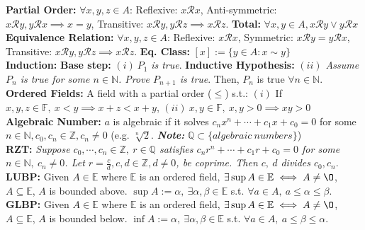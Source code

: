 \documentclass{letter}
\begin{document}
{\small
\textbf{Partial Order:}
$\forall x, y, z \in A$: Reflexive: $x \mathcal{R} x$, Anti-symmetric:
$x \mathcal{R} y, y \mathcal{R} x \implies x = y$, Transitive: $x \mathcal{R} y, y
\mathcal{R} z \implies x \mathcal{R} z$.
\textbf{Total:} $\forall x, y \in A, x \mathcal{R} y \lor y \mathcal{R} x$ \\
\textbf{Equivalence Relation:}
$\forall x, y, z \in A$: Reflexive: $x \mathcal{R} x$, Symmetric:
$x \mathcal{R} y = y \mathcal{R} x$, Transitive: $x \mathcal{R} y, y
\mathcal{R} z \implies x \mathcal{R} z$.
\textbf{Eq. Class:} $[x] := \{y \in A : x \sim y\}$ \\
\textbf{Induction:} \textbf{Base step:} $(i) \ P_1$ \textit{is
true}. \textbf{Inductive Hypothesis:} \textit{$(ii)$ Assume $P_n$ is true
for some $n \in \mathbb{N}$. Prove $P_{n + 1}$ is true}. Then, $P_n$
is true $\forall n \in \mathbb{N}$.
\textbf{Ordered Fields:} A field with a partial order ($\leq$) s.t.:
$(i)$ If $x, y , z \in \mathbb{F}, \ x < y \implies x + z < x + y$,
$(ii) \ x, y \in \mathbb{F}, \ x, y > 0 \implies xy > 0$ \\
\textbf{Algebraic Number:} $a$ is algebraic if it solves $c_nx^n +
\cdots + c_1x + c_0 = 0$ for some $n \in \mathbb{N}, c_0, c_n \in
\mathbb{Z}, c_n \neq 0$ (e.g. $\sqrt[n]{2}$. \textit{\textbf{Note:}}
$\mathbb{Q} \subset \{algebraic \ numbers\}$) \\
{\scriptsize \textbf{RZT:} \textit{Suppose $c_0, \cdots, c_n \in
\mathbb{Z}, \ r \in \mathbb{Q}$ satisfies $c_nr^n + \cdots + c_1r +
c_0 = 0$ for some $n \in \mathbb{N}, \ c_n \neq 0$. Let $r =
\frac{c}{d}, c, d \in \mathbb{Z}, d \neq 0$, be coprime. Then $c, \ d$
divides $c_0, c_n$}.} \\
\textbf{LUBP:}
Given $A \in \mathbb{E}$ where $\mathbb{E}$ is an ordered field,
$\exists \sup{A} \in \mathbb{E} \iff A \neq \O$, $A \subseteq
\mathbb{E}$, $A$ is bounded above. $\sup{A} := \alpha, \ \exists \alpha, \beta \in
\mathbb{E}$ s.t. $\forall a \in A, \ a \leq \alpha \leq \beta$. \\
\textbf{GLBP:}
Given $A \in \mathbb{E}$ where $\mathbb{E}$ is an ordered field,
$\exists \sup{A} \in \mathbb{E} \iff A \neq \O$, $A \subseteq
\mathbb{E}$, $A$ is bounded below. $\inf{A} := \alpha, \ \exists \alpha, \beta \in
\mathbb{E}$ s.t. $\forall a \in A, \ a \leq \beta \leq \alpha$.
}
\end{document}
